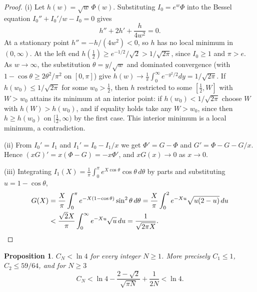 \documentclass[11pt]{amsart}
\newtheorem{proposition}[theorem]{Proposition}
\theoremstyle{definition}
\theoremstyle{remark}
\begin{document}
\begin{proof}
(i) Let $h(w)=\sqrt w\,\Phi(w)$. Substituting $I_0=e^w\Phi$ into the Bessel equation $I_0''+I_0'/w-I_0=0$ gives
\[
 h''+2h'+\frac{h}{4w^2}=0.
\]
At a stationary point $h''=-h/(4w^2)<0$, so $h$ has no local minimum in $(0,\infty)$. At the left end $h(\tfrac12)\ge e^{-1/2}/\sqrt2>1/\sqrt{2\pi}$, since $I_0\ge1$ and $\pi>e$. As $w\to\infty$, the substitution $\theta=y/\sqrt w$ and dominated convergence (with $1-\cos\theta\ge2\theta^2/\pi^2$ on $[0,\pi]$) give $h(w)\to\frac1\pi\int_0^\infty e^{-y^2/2}dy=1/\sqrt{2\pi}$. If $h(w_0)\le1/\sqrt{2\pi}$ for some $w_0>\tfrac12$, then $h$ restricted to some $[\tfrac12,W]$ with $W>w_0$ attains its minimum at an interior point: if $h(w_0)<1/\sqrt{2\pi}$ choose $W$ with $h(W)>h(w_0)$, and if equality holds take any $W>w_0$, since then $h\ge h(w_0)$ on $[\tfrac12,\infty)$ by the first case. This interior minimum is a local minimum, a contradiction.

(ii) From $I_0'=I_1$ and $I_1'=I_0-I_1/x$ we get $\Phi'=G-\Phi$ and $G'=\Phi-G-G/x$. Hence $(xG)'=x(\Phi-G)=-x\Phi'$, and $xG(x)\to0$ as $x\to0$.

(iii) Integrating $I_1(X)=\frac1\pi\int_0^\pi e^{X\cos\theta}\cos\theta\,d\theta$ by parts and substituting $u=1-\cos\theta$,
\begin{align*}
 G(X)&=\frac X\pi\int_0^\pi e^{-X(1-\cos\theta)}\sin^2\theta\,d\theta=\frac X\pi\int_0^2e^{-Xu}\sqrt{u(2-u)}\,du\\
 &<\frac{\sqrt2X}{\pi}\int_0^\infty e^{-Xu}\sqrt u\,du=\frac1{\sqrt{2\pi X}}.\qedhere
\end{align*}
\end{proof}

\begin{proposition}\label{prop:CN}
$C_N<\ln4$ for every integer $N\ge1$. More precisely $C_1\le1$, $C_2\le59/64$, and for $N\ge3$
\[
 C_N<\ln4-\frac{2-\sqrt2}{\sqrt{\pi N}}+\frac1{2N}<\ln4.
\]
\end{proposition}
\end{document}
